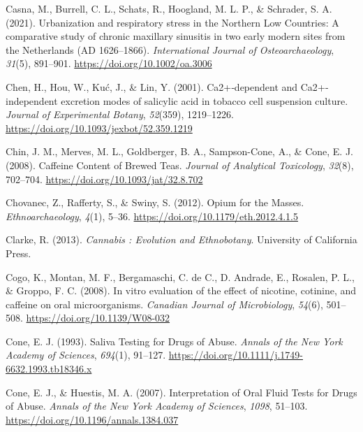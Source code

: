 \documentclass[
]{article}
\newlength{\cslhangindent}
\newlength{\cslentryspacingunit} %
\newenvironment{CSLReferences}[2] %
 {%
  \setlength{\parindent}{0pt}
  \ifodd #1
  \let\oldpar\par
  \def\par{\hangindent=\cslhangindent\oldpar}
  \fi
  \setlength{\parskip}{#2\cslentryspacingunit}
 }%
 {}
\begin{document}
\begin{CSLReferences}{1}{0}
\leavevmode{}%
Casna, M., Burrell, C. L., Schats, R., Hoogland, M. L. P., \& Schrader,
S. A. (2021). Urbanization and respiratory stress in the {Northern Low
Countries}: {A} comparative study of chronic maxillary sinusitis in two
early modern sites from the {Netherlands} ({AD} 1626--1866).
\emph{International Journal of Osteoarchaeology}, \emph{31}(5),
891--901. \url{https://doi.org/10.1002/oa.3006}

\leavevmode{}%
Chen, H., Hou, W., Kuć, J., \& Lin, Y. (2001). Ca2+‐dependent and
{Ca2}+‐independent excretion modes of salicylic acid in tobacco cell
suspension culture. \emph{Journal of Experimental Botany},
\emph{52}(359), 1219--1226.
\url{https://doi.org/10.1093/jexbot/52.359.1219}

\leavevmode{}%
Chin, J. M., Merves, M. L., Goldberger, B. A., Sampson-Cone, A., \&
Cone, E. J. (2008). Caffeine {Content} of {Brewed Teas}. \emph{Journal
of Analytical Toxicology}, \emph{32}(8), 702--704.
\url{https://doi.org/10.1093/jat/32.8.702}

\leavevmode{}%
Chovanec, Z., Rafferty, S., \& Swiny, S. (2012). Opium for the {Masses}.
\emph{Ethnoarchaeology}, \emph{4}(1), 5--36.
\url{https://doi.org/10.1179/eth.2012.4.1.5}

\leavevmode{}%
Clarke, R. (2013). \emph{Cannabis : {Evolution} and {Ethnobotany}}.
{University of California Press}.

\leavevmode{}%
Cogo, K., Montan, M. F., Bergamaschi, C. de C., D. Andrade, E., Rosalen,
P. L., \& Groppo, F. C. (2008). In vitro evaluation of the effect of
nicotine, cotinine, and caffeine on oral microorganisms. \emph{Canadian
Journal of Microbiology}, \emph{54}(6), 501--508.
\url{https://doi.org/10.1139/W08-032}

\leavevmode{}%
Cone, E. J. (1993). Saliva {Testing} for {Drugs} of {Abuse}.
\emph{Annals of the New York Academy of Sciences}, \emph{694}(1),
91--127. \url{https://doi.org/10.1111/j.1749-6632.1993.tb18346.x}

\leavevmode{}%
Cone, E. J., \& Huestis, M. A. (2007). Interpretation of {Oral Fluid
Tests} for {Drugs} of {Abuse}. \emph{Annals of the New York Academy of
Sciences}, \emph{1098}, 51--103.
\url{https://doi.org/10.1196/annals.1384.037}


\end{CSLReferences}
\end{document}
